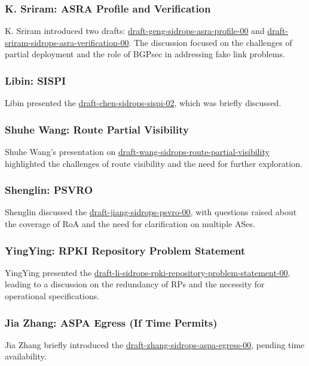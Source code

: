 \documentclass{article}
\begin{document}
\subsubsection{K. Sriram: ASRA Profile and Verification}
K. Sriram introduced two drafts: \href{https://datatracker.ietf.org/doc/html/draft-geng-sidrops-asra-profile-00}{draft-geng-sidrops-asra-profile-00} and \href{https://datatracker.ietf.org/doc/html/draft-sriram-sidrops-asra-verification-00}{draft-sriram-sidrops-asra-verification-00}. The discussion focused on the challenges of partial deployment and the role of BGPsec in addressing fake link problems.

\subsubsection{Libin: SISPI}
Libin presented the \href{https://datatracker.ietf.org/doc/html/draft-chen-sidrops-sispi-02}{draft-chen-sidrops-sispi-02}, which was briefly discussed.

\subsubsection{Shuhe Wang: Route Partial Visibility}
Shuhe Wang's presentation on \href{https://datatracker.ietf.org/doc/html/draft-wang-sidrops-route-partial-visibility}{draft-wang-sidrops-route-partial-visibility} highlighted the challenges of route visibility and the need for further exploration.

\subsubsection{Shenglin: PSVRO}
Shenglin discussed the \href{https://datatracker.ietf.org/doc/html/draft-jiang-sidrops-psvro-00}{draft-jiang-sidrops-psvro-00}, with questions raised about the coverage of RoA and the need for clarification on multiple ASes.

\subsubsection{YingYing: RPKI Repository Problem Statement}
YingYing presented the \href{https://datatracker.ietf.org/doc/html/draft-li-sidrops-rpki-repository-problem-statement-00}{draft-li-sidrops-rpki-repository-problem-statement-00}, leading to a discussion on the redundancy of RPs and the necessity for operational specifications.

\subsubsection{Jia Zhang: ASPA Egress (If Time Permits)}
Jia Zhang briefly introduced the \href{https://datatracker.ietf.org/doc/html/draft-zhang-sidrops-aspa-egress-00}{draft-zhang-sidrops-aspa-egress-00}, pending time availability.
\end{document}
